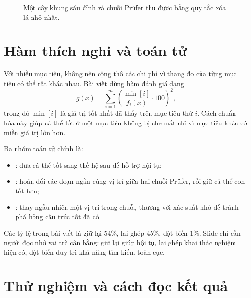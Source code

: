 \documentclass[11pt]{article}
\newcommand{\Pruefer}{Prüfer}
\begin{document}
\begin{figure}[ht]
\centering
{}
\caption{Một cây khung sáu đỉnh và chuỗi \Pruefer{} thu được bằng quy tắc xóa lá nhỏ nhất.}
\end{figure}

\section{Hàm thích nghi và toán tử}

Với nhiều mục tiêu, không nên cộng thô các chi phí vì thang đo của từng mục
tiêu có thể rất khác nhau. Bài viết dùng hàm đánh giá dạng
\[
  g(x)=\sum_{i=1}^{m}
  \left(\frac{\operatorname{min}[i]}{f_i(x)}\cdot 100\right)^2,
\]
trong đó \(\operatorname{min}[i]\) là giá trị tốt nhất đã thấy trên mục tiêu
thứ \(i\). Cách chuẩn hóa này giúp cá thể tốt ở một mục tiêu không bị che mất
chỉ vì mục tiêu khác có miền giá trị lớn hơn.

Ba nhóm toán tử chính là:
\begin{itemize}
  \item {}: đưa cá thể tốt sang thế hệ sau để hỗ trợ hội tụ;
  \item {}: hoán đổi các đoạn ngắn cùng vị trí giữa hai chuỗi
  \Pruefer{}, rồi giữ cá thể con tốt hơn;
  \item {}: thay ngẫu nhiên một vị trí trong chuỗi, thường với
  xác suất nhỏ để tránh phá hỏng cấu trúc tốt đã có.
\end{itemize}
Các tỷ lệ trong bài viết là giữ lại \(54\%\), lai ghép \(45\%\), đột biến
\(1\%\). Slide chỉ cần người đọc nhớ vai trò cân bằng: giữ lại giúp hội tụ,
lai ghép khai thác nghiệm hiện có, đột biến duy trì khả năng tìm kiếm toàn
cục.

\section{Thử nghiệm và cách đọc kết quả}
\end{document}
